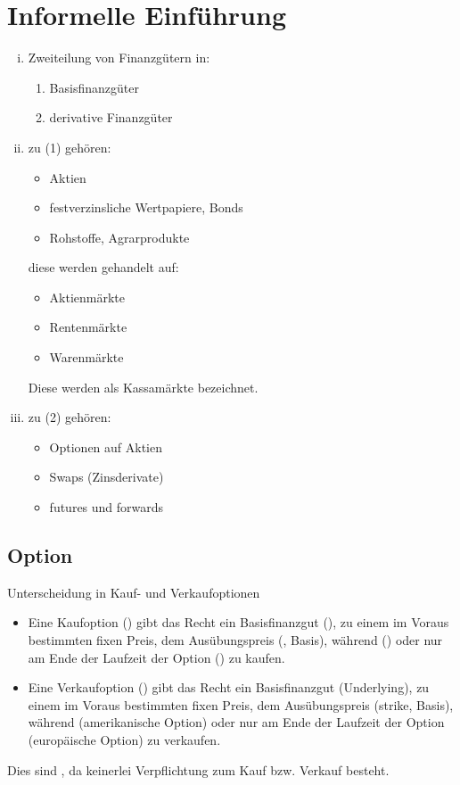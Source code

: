 
\newpage

\section{Informelle Einführung} %
\label{sec: informelle_einführung}

\begin{enumerate}[(i)]
	\item Zweiteilung von Finanzgütern in:
	\begin{enumerate}[(1)]
		\item Basisfinanzgüter
		\item derivative Finanzgüter
	\end{enumerate}
	\item zu (1) gehören:
	\begin{itemize}
		\item Aktien
		\item festverzinsliche Wertpapiere, Bonds
		\item Rohstoffe, Agrarprodukte
	\end{itemize}
diese werden gehandelt auf:
	\begin{itemize}
		\item Aktienmärkte
		\item Rentenmärkte
		\item Warenmärkte
	\end{itemize}
Diese werden als Kassamärkte bezeichnet.

	\item zu (2) gehören:
	\begin{itemize}
		\item Optionen auf Aktien
		\item Swaps (Zinsderivate)
		\item futures und forwards
	\end{itemize}

\end{enumerate}

\subsection{Option} %
\label{sub: option}
Unterscheidung in Kauf- und Verkaufoptionen
\begin{itemize}
	\item Eine Kaufoption () gibt das Recht ein Basisfinanzgut (), zu einem im Voraus bestimmten fixen Preis,
		dem Ausübungspreis (, Basis), während () oder nur am Ende der Laufzeit der Option 	()
		zu kaufen.
	\item  Eine Verkaufoption () gibt das Recht ein Basisfinanzgut (Underlying), zu einem im Voraus bestimmten fixen Preis,
		dem Ausübungspreis (strike, Basis), während (amerikanische Option) oder nur am Ende der Laufzeit der Option (europäische Option)
		zu verkaufen.
\end{itemize}
Dies sind  , da keinerlei Verpflichtung zum Kauf bzw. Verkauf besteht.

